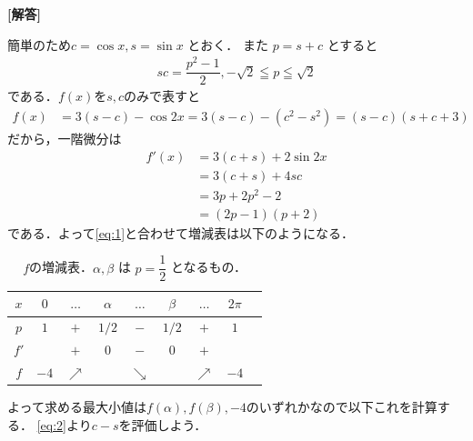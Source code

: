 \documentclass[../../main.tex]{subfiles}
\begin{document}
\begin{oframed}
  
\end{oframed}

{\bf [解答]}

簡単のため$c = \cos x, s = \sin x$ とおく．
また $p = s+c$ とすると
\begin{align}
  sc = \dfrac{p^2-1}{2}, -\sqrt{2} \leqq p \leqq \sqrt{2} \label{eq:1}
\end{align}
である．$f(x)$を$s,c$のみで表すと
\begin{align}
  f(x)  &= 3(s-c) - \cos 2x = 3(s-c) - (c^2-s^2) = (s-c)(s+c+3)  \label{eq:2}
\end{align}
だから，一階微分は
\begin{align}
  f'(x)
  &= 3(c+s) + 2\sin 2x \\
  &= 3(c+s) + 4sc \\
  &= 3p + 2p^2 - 2 \\
  &= (2p-1)(p+2)
\end{align}
である．よって\cref{eq:1}と合わせて増減表は以下のようになる．

\begin{table}[htb]
  \centering
  \caption{$f$の増減表．$\alpha, \beta$ は $p = \dfrac{1}{2}$ となるもの．}
  \begin{tabular}{c|c*6{c}|c}
    $x$ & $0$ & $\dots$ & $\alpha$ & $\dots$ & $\beta$ & $\dots$ & $2\pi$ \\ \hline
    $p$ & $1$ & $+$ & $1/2$ & $-$ & $1/2$ & $+$ & $1$ \\ \hline
    $f'$ & & $+$ & $0$ & $-$ & $0$ & $+$ & \\ \hline
    $f$ & $-4$ & $\nearrow$ & & $\searrow$ & & $\nearrow$ & $-4$
  \end{tabular}
\end{table}
よって求める最大小値は$f(\alpha), f(\beta), -4$のいずれかなので以下これを計算する．
\cref{eq:2}より$c-s$を評価しよう．
\end{document}

